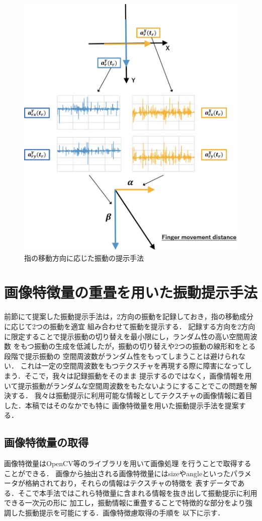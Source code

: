 \begin{figure}[h]
\begin{center}
  \includegraphics[width=12cm]{move.eps}
  \caption{指の移動方向に応じた振動の提示手法}
  \label{4-3}
\end{center}
\end{figure}

\section{画像特徴量の重畳を用いた振動提示手法}
前節にて提案した振動提示手法は，2方向の振動を記録しておき，指の移動成分に応じて2つの振動を適宜
組み合わせて振動を提示する．
記録する方向を2方向に限定することで提示振動の切り替えを最小限にし，ランダム性の高い空間周波数
をもつ振動の生成を低減したが，振動の切り替えや2つの振動の線形和をとる段階で提示振動の
空間周波数がランダム性をもってしまうことは避けられない．
これは一定の空間周波数をもつテクスチャを再現する際に障害になってしまう．そこで，我々は記録振動をそのまま
提示するのではなく，画像情報を用いて提示振動がランダムな空間周波数をもたないようにすることでこの問題を解決する．
我々は振動提示に利用可能な情報としてテクスチャの画像情報に着目した．本稿ではそのなかでも特に
画像特徴量を用いた振動提示手法を提案する．
\subsection{画像特徴量の取得}
画像特徴量はOpenCV等のライブラリを用いて画像処理
を行うことで取得することができる．
画像から抽出される画像特徴量にはsizeやangleといったパラメータが格納されており，それらの情報はテクスチャの特徴を
表すデータである．そこで本手法ではこれら特徴量に含まれる情報を抜き出して振動提示に利用できる一次元の形に
加工し，振動情報に重畳することで特徴的な部分をより強調した振動提示を可能にする．画像特徴慮取得の手順を
以下に示す．



